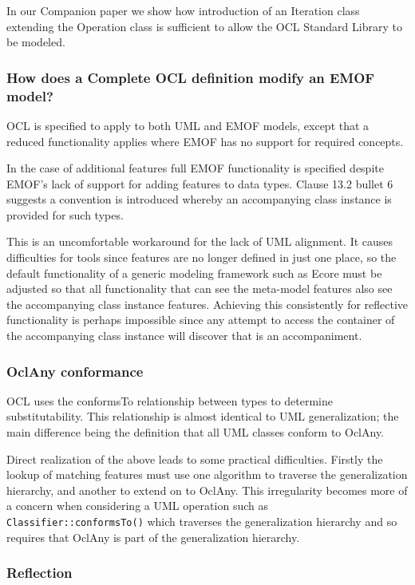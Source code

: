 \documentclass{eceasst}
\begin{document}
In our Companion paper\cite{OCL-stdlib} we show how introduction of an Iteration class extending the Operation class is sufficient to allow the OCL Standard Library to be modeled.


\subsubsection{How does a Complete OCL definition modify an EMOF model?}

OCL is specified to apply to both UML and EMOF models, except that a reduced functionality applies where EMOF has no support for required concepts.

In the case of additional features full EMOF functionality is specified despite EMOF's lack of support for adding features to data types. Clause 13.2 bullet 6 suggests a convention is introduced whereby an accompanying class instance is provided for such types.

This is an uncomfortable workaround for the lack of UML alignment. It causes difficulties for tools since features are no longer defined in just one place, so the default functionality of a generic modeling framework such as Ecore must be adjusted so that all functionality that can see the meta-model features also see the accompanying class instance features. Achieving this consistently for reflective functionality is perhaps impossible since any attempt to access the container of the accompanying class instance will discover that is  an accompaniment.

\subsubsection{OclAny conformance}

OCL uses the conformsTo relationship between types to determine substitutability. This relationship is almost identical to UML generalization; the main difference being the definition that all UML classes conform to OclAny.

Direct realization of the above leads to some practical difficulties. Firstly the lookup of matching features must use one algorithm to traverse the generalization hierarchy, and another to extend on to OclAny. This irregularity becomes more of a concern when considering a UML operation such as \verb|Classifier::conformsTo()| which traverses the generalization hierarchy and so requires that OclAny is part of the generalization hierarchy.

\subsubsection{Reflection}
\end{document}
